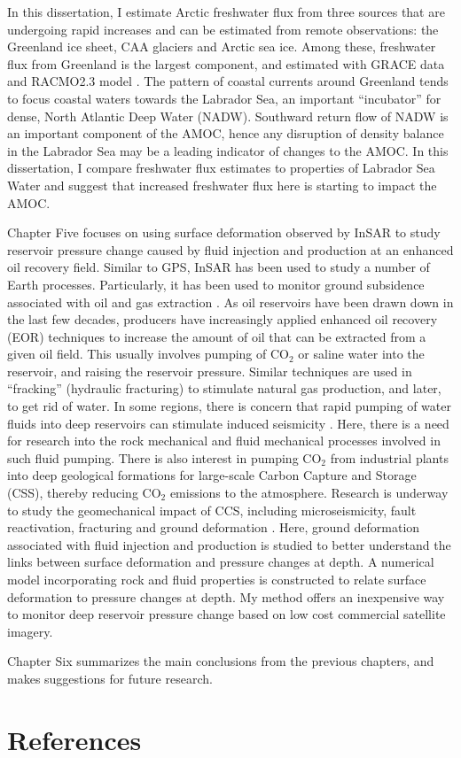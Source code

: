In this dissertation, I estimate Arctic freshwater flux from three sources that are undergoing rapid increases and can be estimated from remote observations: the Greenland ice sheet, CAA glaciers and Arctic sea ice.  Among these, freshwater flux from Greenland is the largest component, and estimated with GRACE data and RACMO2.3 model \cite[]{ettema2009intro,noel2015intro}.  The pattern of coastal currents around Greenland tends to focus coastal waters towards the Labrador Sea, an important ``incubator'' for dense, North Atlantic Deep Water (NADW).  Southward return flow of NADW is an important component of the AMOC, hence any disruption of density balance in the Labrador Sea may be a leading indicator of changes to the AMOC.  In this dissertation, I compare freshwater flux estimates to properties of Labrador Sea Water and suggest that increased freshwater flux here is starting to impact the AMOC.  

Chapter Five focuses on using surface deformation observed by InSAR to study reservoir pressure change caused by fluid injection and production at an enhanced oil recovery field.  Similar to GPS, InSAR has been used to study a number of Earth processes.  Particularly, it has been used to monitor ground subsidence associated with oil and gas extraction \cite[]{tomas2005intro}.  As oil reservoirs have been drawn down in the last few decades, producers have increasingly applied enhanced oil recovery (EOR) techniques to increase the amount of oil that can be extracted from a given oil field.  This usually involves pumping of CO$_{2}$ or saline water into the reservoir, and raising the reservoir pressure.  Similar techniques are used in ``fracking'' (hydraulic fracturing) to stimulate natural gas production, and later, to get rid of water.  In some regions, there is concern that rapid pumping of water fluids into deep reservoirs can stimulate induced seismicity \cite[e.g.,][]{keranen2013intro,mcgarr2015intro}.  Here, there is a need for research into the rock mechanical and fluid mechanical processes involved in such fluid pumping.  There is also interest in pumping CO$_{2}$ from industrial plants into deep geological formations for large-scale Carbon Capture and Storage (CSS), thereby reducing CO$_{2}$ emissions to the atmosphere.  Research is underway to study the geomechanical impact of CCS, including microseismicity, fault reactivation, fracturing and ground deformation \cite[e.g.,][]{streit2004intro,zhou2010intro,mazzoldi2012intro,rinaldi2013intro,vasco2010intro}.  Here, ground deformation associated with fluid injection and production is studied to better understand the links between surface deformation and pressure changes at depth.  A numerical model incorporating rock and fluid properties is constructed to relate surface deformation to pressure changes at depth.  My method offers an inexpensive way to monitor deep reservoir pressure change based on low cost commercial satellite imagery.  

Chapter Six summarizes the main conclusions from the previous chapters, and makes suggestions for future research.  

\section{References}
  
